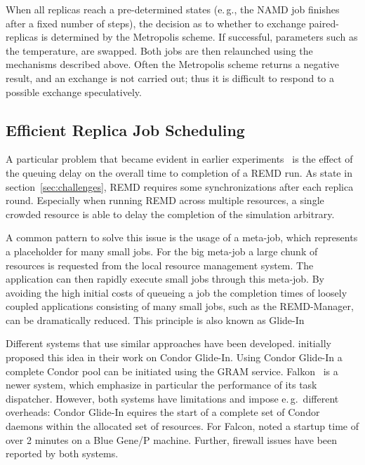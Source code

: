 \documentclass{rspublic}
\newcommand{\glidein}[1]{Glide-In }
\begin{document}
When all replicas reach a pre-determined states (e.\,g., the NAMD job finishes 
after a fixed number of steps), the decision as to whether to exchange
paired-replicas is determined by the Metropolis scheme. If successful,
parameters such as the temperature, are swapped. Both jobs are then
relaunched using the mechanisms described above. Often the Metropolis
scheme returns a negative result, and an exchange is not carried out;
thus it is difficult to respond to a possible exchange speculatively. 

           
\subsection{Efficient Replica Job Scheduling}

A particular problem that became evident in earlier
experiments~\citep{Luckow:2008la} is the effect of the 
queuing delay on the overall time to completion of a REMD run.
As state in section~\ref{sec:challenges}, REMD requires some
synchronizations after each replica round. Especially when running
REMD across multiple resources, a single crowded resource is able to
delay the completion of the simulation arbitrary. 

A common pattern to solve this issue is the usage of a meta-job, which represents
a placeholder for many small jobs. For the big meta-job a large chunk of resources 
is requested from the local resource management system. The application can then rapidly 
execute small jobs through this meta-job. By avoiding the high initial costs of queueing a job
the completion times of loosely coupled applications consisting of
many small jobs, such as the REMD-Manager, can be dramatically reduced. This principle is also known as \glidein.

Different systems that use similar approaches have been developed. \citet{citeulike:291860} initially proposed
this idea in their work on Condor Glide-In. Using Condor Glide-In a complete Condor pool can
be initiated using the GRAM service. Falkon~\citet{1362680} is a newer system, which emphasize in particular
the performance of its task dispatcher.   However, both systems have 
limitations and impose e.\,g.\ different overheads:
Condor \glidein requires the start of a complete set of Condor daemons within the
allocated set of resources. For Falcon, \citet{citeulike:3169002}
noted a startup time of over 2 minutes on a Blue Gene/P machine. Further, 
firewall issues have been reported by both systems.
  
\end{document}
